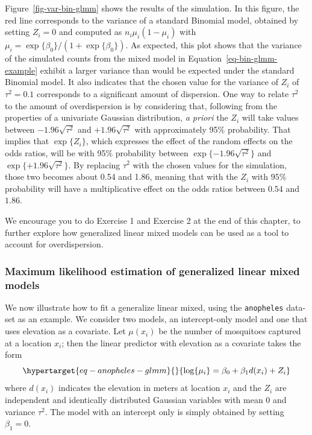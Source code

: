 \documentclass[
  letterpaper,
]{krantz}
\begin{document}
Figure~\ref{fig-var-bin-glmm} shows the results of the simulation. In
this figure, the red line corresponds to the variance of a standard
Binomial model, obtained by setting \(Z_i=0\) and computed as
\(n_i \mu_i (1-\mu_i)\) with
\(\mu_i = \exp\{\beta_0\}/(1+\exp\{\beta_0\})\). As expected, this plot
shows that the variance of the simulated counts from the mixed model in
Equation~\ref{eq-bin-glmm-example} exhibit a larger variance than would
be expected under the standard Binomial model. It also indicates that
the chosen value for the variance of \(Z_i\) of \(\tau^2 = 0.1\)
corresponds to a significant amount of dispersion. One way to relate
\(\tau^2\) to the amount of overdispersion is by considering that,
following from the properties of a univariate Gaussian distribution,
\emph{a priori} the \(Z_i\) will take values between
\(-1.96 \sqrt{\tau^2}\) and \(+1.96 \sqrt{\tau^2}\) with approximately
95\(\%\) probability. That implies that \(\exp\{Z_i\}\), which expresses
the effect of the random effects on the odds ratios, will be with
95\(\%\) probability between \(\exp\{-1.96 \sqrt{\tau^2}\}\) and
\(\exp\{+1.96 \sqrt{\tau^2}\}\). By replacing \(\tau^2\) with the chosen
values for the simulation, those two becomes about 0.54 and 1.86,
meaning that with the \(Z_i\) with \(95\%\) probability will have a
multiplicative effect on the odds ratios between \(0.54\) and \(1.86\).

We encourage you to do Exercise 1 and Exercise 2 at the end of this
chapter, to further explore how generalized linear mixed models can be
used as a tool to account for overdispersion.

\hypertarget{maximum-likelihood-estimation-of-generalized-linear-mixed-models}{%
\subsubsection{Maximum likelihood estimation of generalized linear mixed
models}\label{maximum-likelihood-estimation-of-generalized-linear-mixed-models}}

We now illustrate how to fit a generalize linear mixed, using the
\texttt{anopheles} data-set as an example. We consider two models, an
intercept-only model and one that uses elevation as a covariate. Let
\(\mu(x_i)\) be the number of mosquitoes captured at a location \(x_i\);
then the linear predictor with elevation as a covariate takes the form
\begin{equation}\protect\hypertarget{eq-anopheles-glmm}{}{
\log\{\mu_i\} = \beta_{0} + \beta_{1} d(x_i) + Z_i
}\label{eq-anopheles-glmm}\end{equation} where \(d(x_i)\) indicates the
elevation in meters at location \(x_i\) and the \(Z_i\) are independent
and identically distributed Gaussian variables with mean 0 and variance
\(\tau^2\). The model with an intercept only is simply obtained by
setting \(\beta_1 = 0\).
\end{document}
